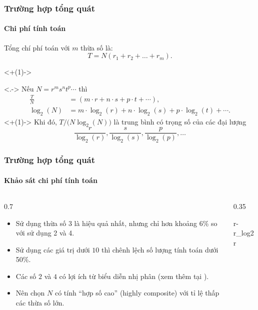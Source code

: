 \begin{frame}
  \frametitle{Trường hợp tổng quát}
  \framesubtitle{Chi phí tính toán}

  Tổng chí phí toán với $m$ thừa số là: \begin{equation*}
    T = N(r_1 + r_2 + \dots + r_m).
  \end{equation*}

  \onslide<+(1)->
  \begin{rem}<.->
    Nếu $N = r^ms^nt^p\dotsm$ thì
    \begin{align*}
      \frac{T}{N} &= (m \cdot r + n \cdot s + p \cdot t + \dotsb ), \\
      \log_2(N) &= m \cdot \log_2(r) + n \cdot \log_2(s) + p \cdot \log_2(t) +
      \dotsb.
    \end{align*} \onslide<+(1)-> Khi đó, $T/\bigl( N\log_2(N)\bigr )$ là trung
    bình có trọng số của các đại lượng \begin{equation*}
      \frac{r}{\log_2(r)}, \frac{s}{\log_2(s)}, \frac{p}{\log_2(p)}, \dotsc
    \end{equation*}
  \end{rem}
\end{frame}

\begin{frame}
  \frametitle{Trường hợp tổng quát}
  \framesubtitle{Khảo sát chi phí tính toán}

  \begin{columns}
    \begin{column}{0.7\textwidth}
      \begin{itemize}[<+->]
        \item Sử dụng thừa số $3$ là hiệu quả nhất, nhưng chỉ hơn khoảng 6\% so
          với sử dụng 2 và 4.
        \item Sử dụng các giá trị dưới $10$ thì chênh lệch số lượng tính toán
          dưới 50\%.
        \item Các số $2$ và $4$ có lợi ích từ biểu diễn nhị phân (xem thêm tại
          \cite{cooley1965algorithm}).
        \item Nên chọn $N$ có tính ``hợp số cao'' (highly composite) với tỉ lệ
          thấp các thừa số lớn.
      \end{itemize}

    \end{column}

    \begin{column}{0.35\textwidth}
      \begin{table}
        \centering
        \caption{Giá trị khảo sát $r$ và $r / \log_2(r)$}
        {r-r_log2r}
      \end{table}
    \end{column}
  \end{columns}
\end{frame}

